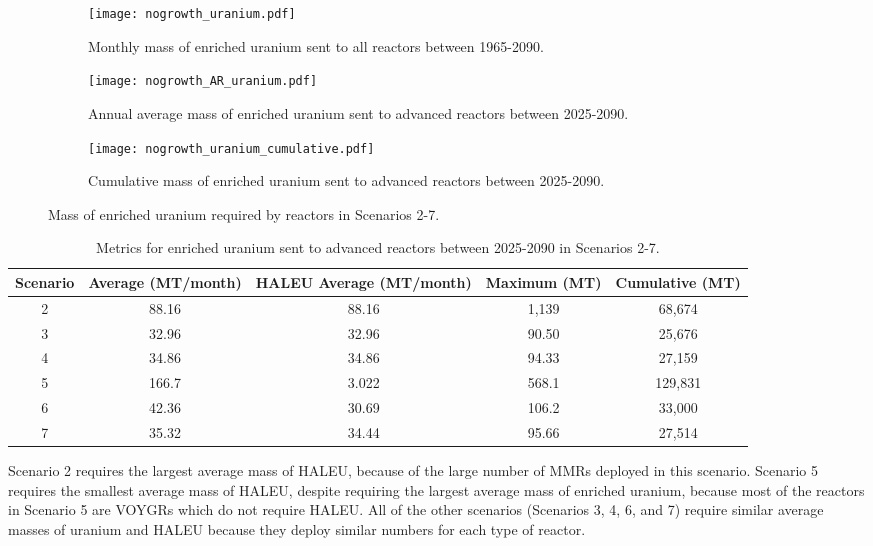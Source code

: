 \begin{figure}
    \centering
    \begin{subfigure}[b]{0.45\textwidth}
        \centering
        \texttt{[image: nogrowth\_uranium.pdf]}
        \caption{Monthly mass of enriched uranium sent to all reactors 
        between 1965-2090.}
        \label{fig:nogrowth_all_uranium}
    \end{subfigure}
    \hfill
    \begin{subfigure}[b]{0.45\textwidth}
        \centering
        \texttt{[image: nogrowth\_AR\_uranium.pdf]}
        \caption{Annual average mass of enriched uranium sent to 
        advanced reactors between 2025-2090.}
        \label{fig:nogrowth_AR_uranium}
    \end{subfigure}
    \begin{subfigure}[b]{0.45\textwidth}
        \centering
        \texttt{[image: nogrowth\_uranium\_cumulative.pdf]}
        \caption{Cumulative mass of enriched 
        uranium sent to advanced reactors between 2025-2090.}
        \label{fig:nogrowth_uranium_cumulative}
    \end{subfigure}
       \caption{Mass of enriched uranium required by reactors
        in Scenarios 2-7.}
       \label{fig:nogrowth_uranium}
\end{figure}

\begin{table}
    \centering 
    \caption{Metrics for enriched uranium sent to advanced 
    reactors between 2025-2090 in Scenarios 2-7.}
    \label{tab:nogrowth_uranium}
    \begin{tabular}{c c c c c}
        \hline
        Scenario & Average (MT/month) & \gls{HALEU} Average 
        (MT/month) & Maximum (MT)& Cumulative (MT)\\\hline
        2 & 88.16 & 88.16 & 1,139 & 68,674\\
        3 & 32.96 & 32.96 & 90.50 & 25,676\\
        4 & 34.86 & 34.86 & 94.33 & 27,159\\
        5 & 166.7 & 3.022 & 568.1 & 129,831\\
        6 & 42.36 & 30.69 & 106.2 & 33,000\\
        7 & 35.32 & 34.44 & 95.66 & 27,514\\
        \hline
    \end{tabular}
\end{table}

Scenario 2 requires the largest average mass of \gls{HALEU}, because 
of the large number of \glspl{MMR} deployed in this scenario. Scenario 
5 requires the smallest average mass of \gls{HALEU}, despite requiring the 
largest average mass of enriched uranium, because most of the 
reactors in Scenario 5 are VOYGRs which do not require \gls{HALEU}. 
All of the other scenarios (Scenarios 3, 4, 6, and 7) require similar 
average masses of uranium and \gls{HALEU} because they deploy similar 
numbers for each type of reactor. 

